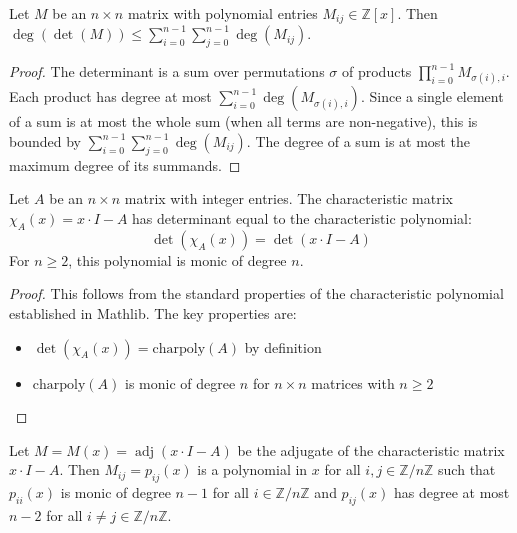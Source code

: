 \begin{lemma}
\label{lem:det_degree_le_sum_degrees}
\leanok
Let $M$ be an $n \times n$ matrix with polynomial entries $M_{ij} \in \mathbb{Z}[x]$.
Then $\deg(\det(M)) \leq \sum_{i=0}^{n-1} \sum_{j=0}^{n-1} \deg(M_{ij})$.
\end{lemma}

\begin{proof}
The determinant is a sum over permutations $\sigma$ of products $\prod_{i=0}^{n-1} M_{\sigma(i),i}$.
Each product has degree at most $\sum_{i=0}^{n-1} \deg(M_{\sigma(i),i})$.
Since a single element of a sum is at most the whole sum (when all terms are non-negative), 
this is bounded by $\sum_{i=0}^{n-1} \sum_{j=0}^{n-1} \deg(M_{ij})$.
The degree of a sum is at most the maximum degree of its summands.
\end{proof}

\begin{lemma}
\label{lem:charmatrix_helpers}
\leanok
Let $A$ be an $n \times n$ matrix with integer entries. The characteristic matrix $\chi_A(x) = x \cdot I - A$ has determinant equal to the characteristic polynomial:
$$\det(\chi_A(x)) = \det(x \cdot I - A)$$
For $n \geq 2$, this polynomial is monic of degree $n$.
\end{lemma}

\begin{proof}
This follows from the standard properties of the characteristic polynomial established in Mathlib.
The key properties are:
\begin{itemize}
\item $\det(\chi_A(x)) = \text{charpoly}(A)$ by definition
\item $\text{charpoly}(A)$ is monic of degree $n$ for $n \times n$ matrices with $n \geq 2$
\end{itemize}
\end{proof}

\begin{lemma}
\label{lem:adj_poly}
Let $M = M(x) = \operatorname{adj}(x\cdot I - A)$ be the adjugate of the characteristic matrix $x\cdot I - A$.
Then $M_{ij} = p_{ij}(x)$ is a polynomial in $x$ for all $i,j\in \mathbb{Z}/n\mathbb{Z}$ such that
$p_{ii}(x)$ is monic of degree $n-1$ for all $i\in \mathbb{Z}/n\mathbb{Z}$ and
$p_{ij}(x)$ has degree at most $n-2$ for all $i\neq j\in \mathbb{Z}/n\mathbb{Z}$.
\end{lemma}

